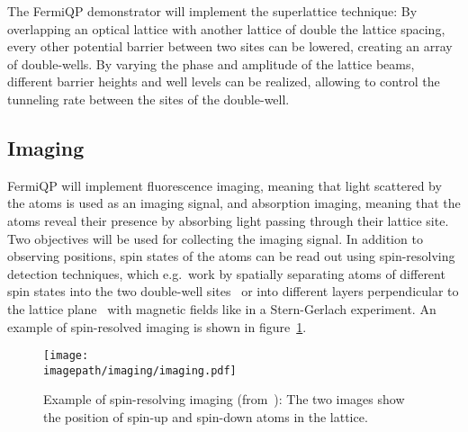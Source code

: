 The FermiQP demonstrator will implement the superlattice technique: By overlapping an optical lattice with another lattice of double the lattice spacing, every other potential barrier between two sites can be lowered, creating an array of double-wells. By varying the phase and amplitude of the lattice beams, different barrier heights and well levels can be realized, allowing to control the tunneling rate between the sites of the double-well.

\subsection*{Imaging}
FermiQP will implement fluorescence imaging, meaning that light scattered by the atoms is used as an imaging signal, and absorption imaging, meaning that the atoms reveal their presence by absorbing light passing through their lattice site. Two objectives will be used for collecting the imaging signal. In addition to observing positions, spin states of the atoms can be read out using spin-resolving detection techniques, which e.g.~work by spatially separating atoms of different spin states into the two double-well sites~\cite{boll_spin-_2016} or into different layers perpendicular to the lattice plane~\cite{koepsell_robust_2020} with magnetic fields like in a Stern-Gerlach experiment. An example of spin-resolved imaging is shown in figure~\ref{fig:absorption_image}.

\begin{figure}
    \centering
    \texttt{[image: \\imagepath/imaging/imaging.pdf]}
    \caption{Example of spin-resolving imaging (from~\cite{koepsell_robust_2020}): The two images show the position of spin-up and spin-down atoms in the lattice.}
    \label{fig:absorption_image}
\end{figure}

